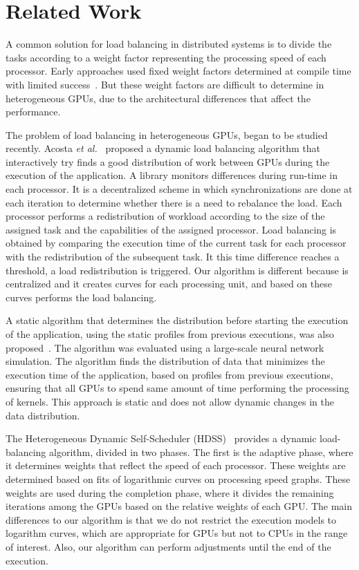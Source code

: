 \documentclass[journal]{IEEEtran}
\begin{document}

\section{Related Work}

A common solution for load balancing in distributed systems is to divide the tasks
according to a weight factor representing the processing speed of each
processor. Early approaches used fixed weight factors determined at compile time
with limited success~\cite{Hummel}. But these weight factors are difficult to
determine in heterogeneous GPUs, due to the architectural differences that affect
the performance.

The problem of load balancing in heterogeneous GPUs, began to be studied
recently. Acosta \emph{et al.}~\cite{acosta} proposed a dynamic load balancing
algorithm that interactively try finds a good distribution of work between GPUs
during the execution of the application. A library monitors differences during run-time in each processor. It is a decentralized scheme in which synchronizations are done at each iteration to determine whether there is a need to rebalance the load. Each processor performs a redistribution of workload according to the size of the assigned task and the capabilities of
the assigned processor. Load balancing is obtained by comparing the execution
time of the current task for each processor with the redistribution of the
subsequent task. It this time difference reaches a threshold, a load redistribution is
triggered. Our algorithm is different because is centralized and it creates curves for each
 processing unit, and based on these curves performs the load balancing.

A static algorithm that determines the distribution before starting the
execution of the application, using the static profiles from previous
executions, was also proposed~\cite{raphael}. The algorithm was evaluated using
a large-scale neural network simulation. The algorithm finds the distribution of
data that minimizes the execution time of the application, based on profiles
from previous executions, ensuring that all GPUs to spend same amount of time
performing the processing of kernels. This approach is static and does not allow dynamic
changes in the data distribution.

The Heterogeneous Dynamic Self-Scheduler (HDSS)~\cite{HDSS} provides a dynamic
load-balancing algorithm, divided in two phases. The first is the adaptive
phase, where it determines weights that reflect the speed of each processor.
These weights are determined based on fits of logarithmic curves on processing
speed graphs. These weights are used during the completion phase, where it
divides the remaining iterations among the GPUs based on the relative weights of
each GPU. The main differences to our algorithm is that we do not restrict the
execution models to logarithm curves, which are appropriate for GPUs but not to
CPUs in the range of interest. Also, our algorithm can perform adjustments until
the end of the execution.
\end{document}
